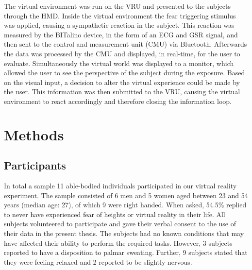 The virtual environment was run on the VRU and presented to the subjects through the HMD. Inside the virtual environment the fear triggering stimulus was applied, causing a sympathetic reaction in the subject. This reaction was measured by the BITalino device, in the form of an ECG and GSR signal, and then sent to the control and measurement unit (CMU) via Bluetooth. Afterwards the data was processed by the CMU and displayed, in real-time, for the user to evaluate. Simultaneously the virtual world was displayed to a monitor, which allowed the user to see the perspective of the subject during the exposure. Based on the visual input, a decision to alter the virtual experience could be made by the user. This information was then submitted to the VRU, causing the virtual environment to react accordingly and therefore closing the information loop.


\newpage
\section{Methods}\label{Methods}

\subsection{Participants}
In total a sample 11 able-bodied individuals participated in our virtual reality experiment. The sample consisted of 6 men and 5 women aged between 23 and 54 years (median age: 27), of which 9 were right handed. When asked, 54.5\% replied to never have experienced fear of heights or virtual reality in their life. All subjects volunteered to participate and gave their verbal consent to the use of their data in the present thesis. The subjects had no known conditions that may have affected their ability to perform the required tasks. However, 3 subjects reported to have a disposition to palmar sweating. Further, 9 subjects stated that they were feeling relaxed and 2 reported to be slightly nervous.

